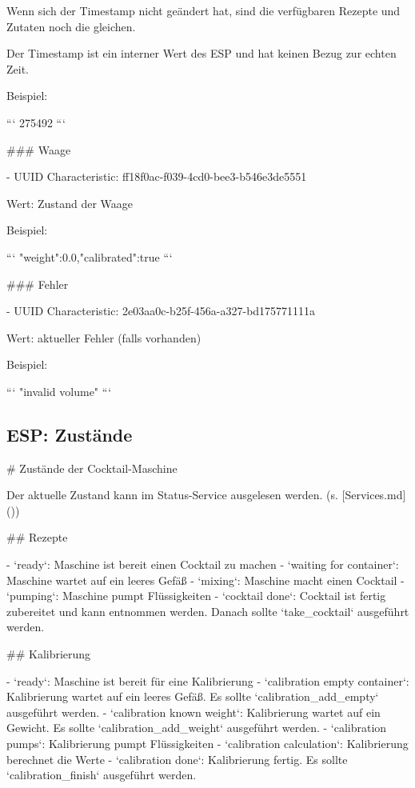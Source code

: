 {	Wenn sich der Timestamp nicht geändert hat, sind die verfügbaren Rezepte und Zutaten noch die gleichen.
	
	Der Timestamp ist ein interner Wert des ESP und hat keinen Bezug zur echten Zeit.
	
	Beispiel:
	
	```
	275492
	```
	
	### Waage
	
	- UUID Characteristic: ff18f0ac-f039-4cd0-bee3-b546e3de5551
	
	Wert: Zustand der Waage
	
	Beispiel:
	
	```
	{"weight":0.0,"calibrated":true}
	```
	
	### Fehler
	
	- UUID Characteristic: 2e03aa0c-b25f-456a-a327-bd175771111a
	
	Wert: aktueller Fehler (falls vorhanden)
	
	Beispiel:
	
	```
	"invalid volume"
	```
	
	\subsection{ESP: Zustände}
	# Zustände der Cocktail-Maschine
	
	Der aktuelle Zustand kann im Status-Service ausgelesen werden. (s. [Services.md]())
	
	## Rezepte
	
	- `ready`: Maschine ist bereit einen Cocktail zu machen
	- `waiting for container`: Maschine wartet auf ein leeres Gefäß
	- `mixing`: Maschine macht einen Cocktail
	- `pumping`: Maschine pumpt Flüssigkeiten
	- `cocktail done`: Cocktail ist fertig zubereitet und kann entnommen werden. Danach sollte `take_cocktail` ausgeführt werden.
	
	## Kalibrierung
	
	- `ready`: Maschine ist bereit für eine Kalibrierung
	- `calibration empty container`: Kalibrierung wartet auf ein leeres Gefäß. Es sollte `calibration_add_empty` ausgeführt werden.
	- `calibration known weight`: Kalibrierung wartet auf ein Gewicht. Es sollte `calibration_add_weight` ausgeführt werden.
	- `calibration pumps`: Kalibrierung pumpt Flüssigkeiten
	- `calibration calculation`: Kalibrierung berechnet die Werte
	- `calibration done`: Kalibrierung fertig. Es sollte `calibration_finish` ausgeführt werden.

}
